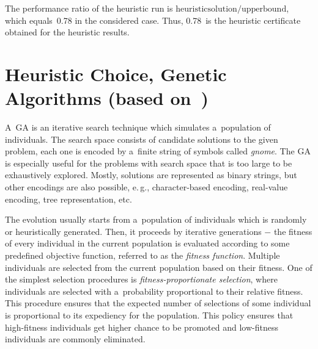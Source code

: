 \begin{multicols}{2}
\noindent
 The
performance ratio of the heuristic run is ${\mathrm{heuristic
solution}}/{\mathrm{upper bound}}$, which equals~0.78 in the considered case.
Thus, 0.78~is the heuristic certificate obtained for the heuristic
results.


\vspace*{-8pt}

\section{Heuristic Choice, Genetic Algorithms (based on~\cite{Sipper1996})} \label{s:GA}

\noindent
A~GA is an iterative
search technique which simulates a~population of individuals. The
search space consists of candidate solutions to the given problem,
each one is encoded by a~finite string of symbols called
\textit{gnome}. The GA is especially useful for the
problems with search space that is too large to be exhaustively
explored. Mostly, solutions are represented as binary strings, but
other encodings are also possible, e.\,g., character-based encoding,
real-value encoding, tree representation, etc.

The evolution usually starts from a~population of individuals which
is randomly or heuristically generated. Then, it proceeds by
iterative generations $-$ the fitness of every individual in the
current population is evaluated according to some predefined
objective function, referred to as the \textit{fitness function}.
Multiple individuals are selected from the current population based
on their fitness. One of the simplest selection procedures is
\textit{fitness-proportionate selection}, where individuals are
selected with a~probability proportional to their relative fitness.
This procedure ensures that the expected number of selections of
some individual is proportional to its expediency for the
population. This policy ensures that high-fitness individuals get
higher chance to be promoted and low-fitness individuals are
commonly eliminated.


\end{multicols}
